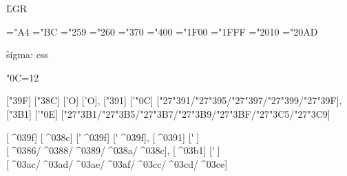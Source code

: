 {\f LGR}

\LgrZZZSerifRegular
\ChrA="A4 \ChrB="BC
\PrintCode
\ChrA="259 \ChrB="260
\PrintCode
\ChrA="370 \ChrB="400
\PrintCode
\ChrA="1F00 \ChrB="1FFF
\PrintCode
\ChrA="2010 \ChrB="20AD
\PrintCode

{\f sigma:} ^^63^^73^^73

\catcode"0C=12

[\char"39F] [\char"38C] ['\relax Ο] ['Ο],
[\char"391] ['\char"0C] [\char"27\char"391/\char"27\char"395/\char"27\char"397/\char"27\char"399/\char"27\char"39F],
[\char"3B1] ['\char"0E] [\char"27\char"3B1/\char"27\char"3B5/\char"27\char"3B7/\char"27\char"3B9/\char"27\char"3BF/\char"27\char"3C5/\char"27\char"3C9]

[^^^^039f] [^^^^038c] ['\relax ^^^^039f] [^^27^^^^039f],
[^^^^0391] [^^27^^0c] [^^^^0386/^^^^0388/^^^^0389/^^^^038a/^^^^038c],
[^^^^03b1] [^^27^^0e] [^^^^03ac/^^^^03ad/^^^^03ae/^^^^03af/^^^^03cc/^^^^03cd/^^^^03ce]

\bye
